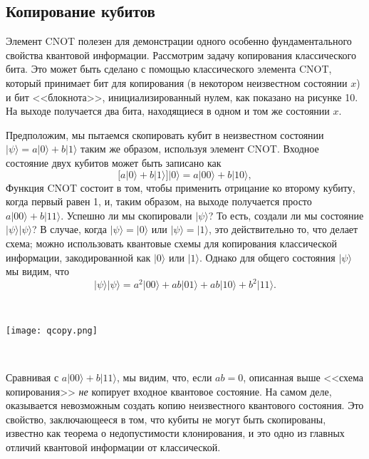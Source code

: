 \begin{multicols}{2}
    \section*{Копирование кубитов}
    \normalsize{
        Элемент CNOT полезен для демонстрации одного особенно фундаментального свойства
        квантовой информации. Рассмотрим задачу копирования классического бита. Это может быть сделано
        с помощью классического элемента CNOT, который принимает бит для копирования (в некотором неизвестном состоянии $x$)
        и бит <<блокнота>>, инициализированный нулем, как показано на рисунке 10. На выходе получается два
        бита, находящиеся в одном и том же состоянии $x$.

        Предположим, мы пытаемся скопировать кубит в неизвестном состоянии $\vert\psi\rangle=a \vert0\rangle+b \vert1\rangle$ таким же
        образом, используя элемент CNOT. Входное состояние двух кубитов может быть записано как
        \begin{equation}
            \big[a\vert0\rangle+b\vert1\rangle\big]\vert0\rangle=a\vert00\rangle+b\vert10\rangle,
        \end{equation}
        Функция CNOT состоит в том, чтобы применить отрицание ко второму кубиту, когда первый равен 1, и, таким образом, 
        на выходе получается просто $a\vert00\rangle+b\vert11\rangle$. Успешно ли мы скопировали $\vert\psi\rangle$? 
        То есть, создали ли мы состояние $\vert\psi\rangle\vert\psi\rangle$? В случае, когда $\vert\psi\rangle=\vert0\rangle$ или $\vert\psi\rangle=\vert1\rangle$, это действительно то, что делает 
        схема; можно использовать квантовые схемы для копирования классической информации, закодированной как $\vert0\rangle$ или $\vert1\rangle$.  Однако для общего состояния $\vert\psi\rangle$ мы видим, что
        \begin{equation}
            \vert\psi\rangle\vert\psi\rangle=a^2\vert00\rangle+ab\vert01\rangle+ab\vert10\rangle+b^2\vert11\rangle.
        \end{equation}
    }\\
    \begin{flushleft}
        \begin{minipage}{0.3\textwidth}{\texttt{[image: qcopy.png]}}
        \end{minipage}\\
        \vspace{0.3cm}
    \end{flushleft}
    \normalsize{
        Сравнивая с $a\vert00\rangle+b\vert11\rangle$, мы видим, что, если $ab = 0$, описанная выше <<схема копирования>> 
        \emph{не} копирует входное квантовое состояние. На самом деле, оказывается невозможным создать копию
        неизвестного квантового состояния. Это свойство, заключающееся в том, что кубиты не могут быть скопированы, известно
        как теорема о недопустимости клонирования, и это одно из главных отличий квантовой
        информации от классической.

}
\end{multicols}
